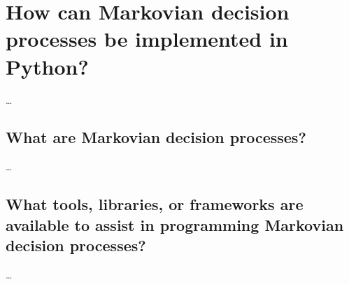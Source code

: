 \section{How can Markovian decision processes be implemented in Python?}
\dots

\subsection{What are Markovian decision processes?}
\dots

\subsection{What tools, libraries, or frameworks are available to assist in programming Markovian decision processes?}
\dots